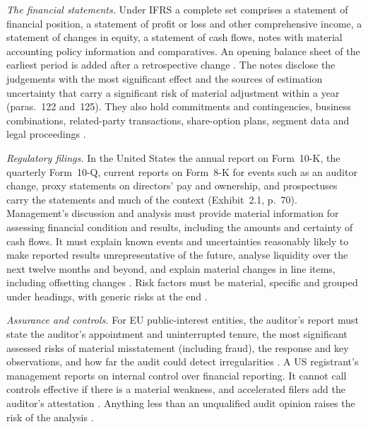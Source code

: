 \begin{qfdefinition}\label{def:filings-disclosures-information-sources}
 \emph{The financial statements.} Under IFRS a complete set comprises a statement of financial position, a statement of profit or loss and other comprehensive income, a statement of changes in equity, a statement of cash flows, notes with material accounting policy information and comparatives. An opening balance sheet of the earliest period is added after a retrospective change \citep[IAS~1 para.~10]{eu-2023-1803-ias1}. The notes disclose the judgements with the most significant effect and the sources of estimation uncertainty that carry a significant risk of material adjustment within a year (paras.~122 and~125). They also hold commitments and contingencies, business combinations, related-party transactions, share-option plans, segment data and legal proceedings \citep[pp.~27--28]{financial-statement-analysis-2009}.

\emph{Regulatory filings.} In the United States the annual report on Form~10-K, the quarterly Form~10-Q, current reports on Form~8-K for events such as an auditor change, proxy statements on directors' pay and ownership, and prospectuses carry the statements and much of the context (Exhibit~2.1, p.~70). Management's discussion and analysis must provide material information for assessing financial condition and results, including the amounts and certainty of cash flows. It must explain known events and uncertainties reasonably likely to make reported results unrepresentative of the future, analyse liquidity over the next twelve months and beyond, and explain material changes in line items, including offsetting changes \citep[para.~(a)--(b)]{sec-sk-item-303}. Risk factors must be material, specific and grouped under headings, with generic risks at the end \citep[paras.~(a)--(b)]{sec-sk-item-105}.

\emph{Assurance and controls.} For EU public-interest entities, the auditor's report must state the auditor's appointment and uninterrupted tenure, the most significant assessed risks of material misstatement (including fraud), the response and key observations, and how far the audit could detect irregularities \citep[Art.~10(2)]{eu-audit-regulation-2014}. A US registrant's management reports on internal control over financial reporting. It cannot call controls effective if there is a material weakness, and accelerated filers add the auditor's attestation \citep[para.~(a)]{sec-sk-item-308}. Anything less than an unqualified audit opinion raises the risk of the analysis \citep[p.~27]{financial-statement-analysis-2009}.


\end{qfdefinition}
